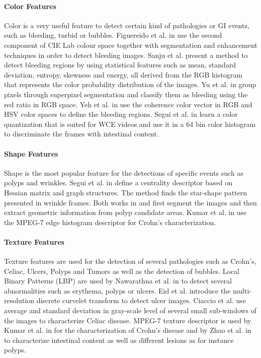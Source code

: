 \documentclass[review,12pt,3p]{elsarticle}
\begin{document}
\paragraph{Color Features}
Color is a very useful feature to detect certain kind of pathologies or GI events, such as bleeding, turbid or bubbles. Figuereido et al. in \cite{figueiredo2013computer} use the second component of CIE Lab colour space together with segmentation and enhancement techniques in order to detect bleeding images. Sanju et al. \cite{Sainju2014} present a method to detect bleeding regions by using statistical features such as mean, standard deviation, entropy, skewness and energy, all derived from the RGB histogram that represents the color probability distribution of the images. Yu et al. in \cite{6497444} group pixels through superpixel segmentation and classify them as bleeding using the red ratio in RGB space. Yeh et al. in \cite{yeh2014bleeding} use the coherence color vector in RGB and HSV color spaces to define the bleeding regions. Segui et al. in \cite{sseguiTurbid} learn a color quantization that is suited for WCE videos and use it in a 64 bin color histogram to discriminate the frames with intestinal content.

\paragraph{Shape Features} Shape is the most popular feature for the detections of specific events such as polyps and wrinkles. Segui et al. in \cite{sseguiWrinkles} define a centrality descriptor based on Hessian matrix and graph structures. The method finds the star-shape pattern presented in wrinkle frames. Both works in \cite{polypsMamonov} and \cite{silivaPolyp2014} first segment the images and then extract geometric information from polyp candidate areas. Kumar et al. in \cite{6051474} use the MPEG-7 edge histogram descriptor for Crohn's characterization.

\paragraph{Texture Features} Texture features are used for the detection of several pathologies such as Crohn's, Celiac, Ulcers, Polyps and Tumors as well as the detection of bubbles. Local Binary Patterns (LBP) are used by Nawarathna et al. in \cite{nawarathna2014abnormal} to detect several abnormalities such as erythema, polyps or ulcers. Eid et al. \cite{Eid2013} introduce the multi-resolution discrete curvelet transform \cite{candes2006fast} to detect ulcer images. Ciaccio et al. \cite{ciaccio2013implementation} use average and standard deviation in gray-scale level of several small sub-windows of the images to characterize Celiac disease.  MPEG-7 texture descriptor is used by Kumar et al. in \cite{6051474} for the characterization of Crohn's disease and by Zhao et al. in \cite{zhao2015general} to characterize intestinal content as well as different lesions as for instance polyps.
\end{document}
